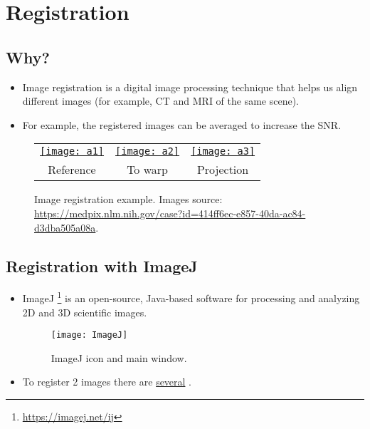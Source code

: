 \chapter{Registration}

\section{Why?}
\begin{itemize}
\item Image registration \cite{Oliveira25012014} is a digital image
  processing technique that helps us align different images (for
  example, \gls{CT} and \gls{MRI} of the same scene).
\item For example, the registered images can be averaged to increase
  the \gls{SNR}.
\end{itemize}

\begin{figure}[H]
  \vspace{-0ex}
  \centering
  \begin{tabular}{ccc}
    \href{https://d2rfm59k9u0hrr.cloudfront.net/medpix/img/full/synpic50411.jpg}{\texttt{[image: a1]}} & \href{https://d2rfm59k9u0hrr.cloudfront.net/medpix/img/full/synpic50412.jpg}{\texttt{[image: a2]}} & \href{sec:ImageJ_registration}{\texttt{[image: a3]}} \\
    Reference & To warp & Projection
  \end{tabular}
  \caption[Image registration example.]{Image registration
    example. Images source:
    \url{https://medpix.nlm.nih.gov/case?id=414ff6ec-e857-40da-ac84-d3dba505a08a}.}
  \label{fig:image_registration}
\end{figure}

\section{Registration with ImageJ}
\label{sec:ImageJ_registration}
\begin{itemize}
  \item ImageJ
    \cite{abramoff2004image}\footnote{\url{https://imagej.net/ij}} is
    an open-source, Java-based software for processing and analyzing
    2D and 3D scientific images.
\begin{figure}[H]
  \vspace{-0ex}
  \centering
  \texttt{[image: ImageJ]}
  \caption{ImageJ icon and main window.}
  \label{fig:ImageJ}
\end{figure}
  \item To register 2 images there are
    \href{https://imagej.net/imaging/registration}{several}
    .
\end{itemize}

